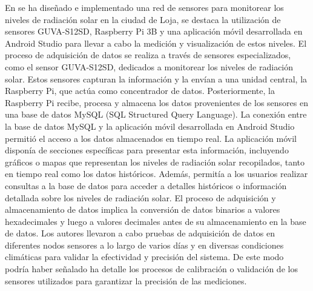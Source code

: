 \bigbreak
En \cite{jaramillo_diseno_2020} se ha diseñado e implementado una red de sensores para monitorear los niveles de radiación solar en la ciudad de Loja, se destaca la utilización de sensores GUVA-S12SD, Raspberry Pi 3B y una aplicación móvil desarrollada en Android Studio para llevar a cabo la medición y visualización de estos niveles. El proceso de adquisición de datos se realiza a través de sensores especializados, como el sensor GUVA-S12SD, dedicados a monitorear los niveles de radiación solar. Estos sensores capturan la información y la envían a una unidad central, la Raspberry Pi, que actúa como concentrador de datos. Posteriormente, la Raspberry Pi recibe, procesa y almacena los datos provenientes de los sensores en una base de datos MySQL (SQL Structured Query Language). La conexión entre la base de datos MySQL y la aplicación móvil desarrollada en Android Studio permitió el acceso a los datos almacenados en tiempo real. La aplicación móvil disponía de secciones específicas para presentar esta información, incluyendo gráficos o mapas que representan los niveles de radiación solar recopilados, tanto en tiempo real como los datos históricos. Además, permitía a los usuarios realizar consultas a la base de datos para acceder a detalles históricos o información detallada sobre los niveles de radiación solar. El proceso de adquisición y almacenamiento de datos implica la conversión de datos binarios a valores hexadecimales y luego a valores decimales antes de su almacenamiento en la base de datos. Los autores llevaron a cabo pruebas de adquisición de datos en diferentes nodos sensores a lo largo de varios días y en diversas condiciones climáticas para validar la efectividad y precisión del sistema. De este modo podría haber señalado ha detalle los procesos de calibración o validación de los sensores utilizados para garantizar la precisión de las mediciones.


